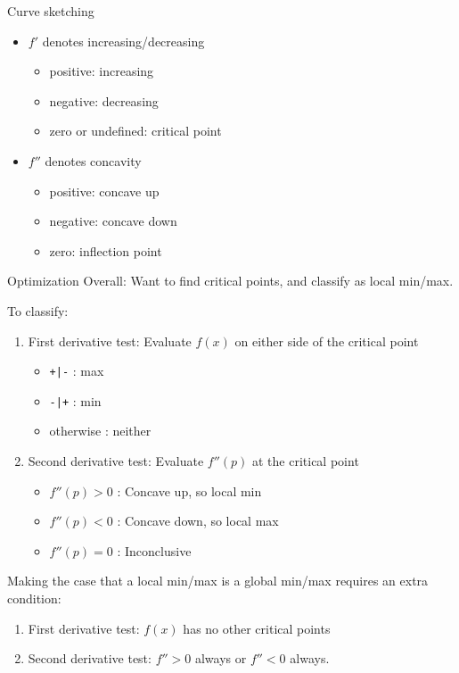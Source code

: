 \documentclass{beamer}
\begin{document}
\begin{frame}[label={sec:orgc1829e8}]{Curve sketching}
\begin{itemize}
\item \(f'\) denotes increasing/decreasing
\begin{itemize}
\item positive: increasing
\item negative: decreasing
\item zero or undefined: critical point
\end{itemize}

\item \(f''\) denotes concavity
\begin{itemize}
\item positive: concave up
\item negative: concave down
\item zero: inflection point
\end{itemize}
\end{itemize}
\end{frame}

\begin{frame}[label={sec:orgbd73406},fragile]{Optimization}
  Overall: Want to find critical points, and classify as local min/max.

  To classify:
\begin{enumerate}
\item First derivative test:
Evaluate \(f(x)\) \alert{on either side} of the critical point
\begin{itemize}
\item \texttt{+|-} : max
\item \texttt{-|+} : min
\item otherwise : neither
\end{itemize}

\item Second derivative test:
Evaluate \(f''(p)\) \alert{at} the critical point

\begin{itemize}
\item \(f''(p)>0\) : Concave up, so local min
\item \(f''(p)<0\) : Concave down, so local max
\item \(f''(p)=0\) : Inconclusive
\end{itemize}
\end{enumerate}

Making the case that a local min/max is a \alert{global} min/max requires an extra condition:
\begin{enumerate}
\item First derivative test: \(f(x)\) has no other critical points
\item Second derivative test: \(f'' > 0\) always or \(f'' < 0\) always.
\end{enumerate}
\end{frame}
\end{document}
